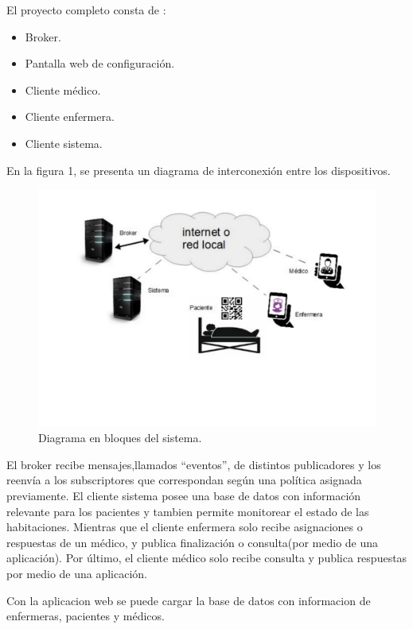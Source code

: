 \documentclass[
11pt, %
]{charter}
\begin{document}
\vspace{50px}

El proyecto completo consta de :
\begin{itemize}
\item Broker.
\item Pantalla web de configuración.
\item Cliente médico.
\item Cliente enfermera.
\item Cliente sistema.
\end{itemize}
En la figura 1, se presenta un diagrama de interconexión entre los dispositivos.



\begin{figure}[htpb]
\centering 
\includegraphics[width=.7\textwidth]{./Figuras/diag1.pdf}
\caption{ Diagrama en bloques del sistema.}
\label{fig:diagBloques}
\end{figure}


El broker recibe mensajes,llamados ``eventos'', de distintos publicadores y los reenvía a los subscriptores que correspondan según una política asignada previamente. El cliente sistema posee una base de datos con información relevante para los pacientes y tambien permite monitorear el estado de las habitaciones. Mientras que el cliente enfermera solo recibe asignaciones o respuestas de un médico, y publica finalización o consulta(por medio de una aplicación). Por último, el cliente médico solo recibe consulta y publica respuestas por medio de una aplicación.

Con la aplicacion web se puede cargar la base de datos con informacion de enfermeras, pacientes y médicos.
\vfill

 
\end{document}
